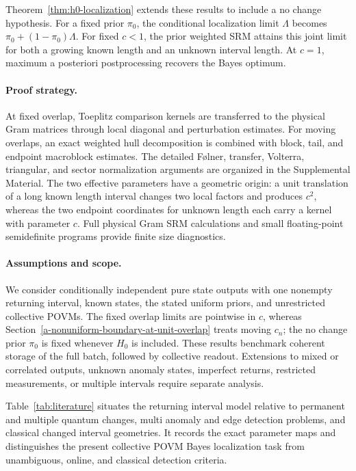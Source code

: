 Theorem~\ref{thm:h0-localization} extends these results to include a
no change hypothesis. For a fixed prior \(\pi_0\), the conditional
localization limit \(\Lambda\) becomes
\(\pi_0+(1-\pi_0)\Lambda\). For fixed \(c<1\), the prior weighted SRM attains
this joint limit for both a growing known length and an unknown interval
length. At \(c=1\), maximum a posteriori postprocessing recovers the Bayes
optimum.

\paragraph{Proof strategy.}
At fixed overlap, Toeplitz comparison kernels are transferred to the physical
Gram matrices through local diagonal and perturbation estimates. For moving
overlaps, an exact weighted hull decomposition is combined with block, tail,
and endpoint macroblock estimates. The detailed Følner, transfer, Volterra,
triangular, and sector normalization arguments are organized in the
Supplemental Material. The two effective parameters have a geometric origin:
a unit translation of a long known length interval changes two local factors
and produces \(c^2\), whereas the two endpoint coordinates for unknown length
each carry a kernel with parameter \(c\). Full physical Gram SRM calculations
and small floating-point semidefinite programs provide finite size diagnostics.

\paragraph{Assumptions and scope.}
We consider conditionally independent pure state outputs with one nonempty
returning interval, known states, the stated uniform priors,
and unrestricted collective POVMs. The fixed overlap limits are pointwise
in \(c\), whereas
Section~\ref{a-nonuniform-boundary-at-unit-overlap} treats moving \(c_n\);
the no change prior \(\pi_0\) is fixed whenever \(H_0\) is included. These
results benchmark coherent storage of the full batch, followed by collective
readout. Extensions to mixed or correlated outputs, unknown anomaly states,
imperfect returns, restricted measurements, or multiple intervals require
separate analysis.

Table~\ref{tab:literature} situates the returning interval model relative to
permanent and multiple quantum changes, multi anomaly and edge detection
problems, and classical changed interval geometries. It records the exact
parameter maps and distinguishes the present collective POVM Bayes
localization task from unambiguous, online, and classical detection criteria.







